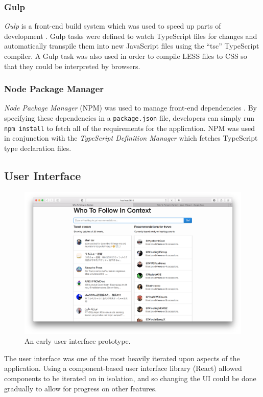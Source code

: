 \documentclass{l4proj}
\newcommand{\code}[1]{\texttt{#1}}
\begin{document}
        \subsubsection{Gulp}
        \textit{Gulp} is a front-end build system which was used to speed up parts of development \cite{gulp}. Gulp tasks were defined to watch TypeScript files for changes and automatically transpile them into new JavaScript files using the ``tsc'' TypeScript compiler. A Gulp task was also used in order to compile LESS files to CSS so that they could be interpreted by browsers.
        
        \subsubsection{Node Package Manager}
        \textit{Node Package Manager} (NPM) was used to manage front-end dependencies \cite{npm}. By specifying these dependencies in a \code{package.json} file, developers can simply run \code{npm install} to fetch all of the requirements for the application. NPM was used in conjunction with the \textit{TypeScript Definition Manager} which fetches TypeScript type declaration files.
        
        \subsection{User Interface}
\begin{figure}
\centering
\includegraphics[scale=0.24]{initialui.png}
\caption{An early user interface prototype.}
\label{initialui}
\end{figure} 

        The user interface was one of the most heavily iterated upon aspects of the application. Using a component-based user interface library (React) allowed components to be iterated on in isolation, and so changing the UI could be done gradually to allow for progress on other features.
        
\end{document}

